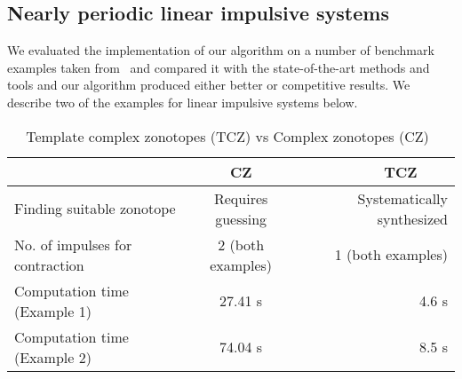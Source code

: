 



\subsection{Nearly periodic linear impulsive systems}\label{sec:lis-ex}

We evaluated the implementation of our algorithm on a number of
benchmark examples taken from~\cite{arvind2016lis} and compared it
with the state-of-the-art methods and tools and our algorithm produced
either better or competitive results.  We describe two of the examples
for linear impulsive systems below.

\begin{table*}
\caption{Template complex zonotopes (TCZ) vs
    Complex zonotopes (CZ)~\cite{arvind2016lis}}
\center
 \begin{tabular}{|l|c|r|}
  \hline
  $~$ & CZ & TCZ $~~~~~~~~$\\
  \hline
  Finding suitable zonotope & Requires guessing & Systematically synthesized\\
\hline
  No. of impulses for contraction & 2 (both examples) & 1 (both examples)\\
  \hline
    Computation time (Example 1) & 27.41 s & 4.6 s \\
\hline
Computation time (Example 2) & 74.04 s & 8.5 s\\
\hline
\end{tabular}
\label{tab:tcz-cz}
\end{table*}


